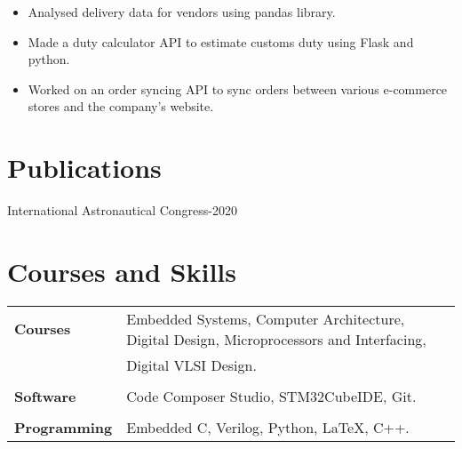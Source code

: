\documentclass{resume}
\begin{document}

\begin{itemize}\setlength{\itemsep}{0pt}\setlength{\parskip}{0pt}\vspace{-0.5em}
    \item Analysed delivery data for vendors using pandas library.
    \item Made a duty calculator API to estimate customs duty using Flask and python.
    \item Worked on an order syncing API to sync orders between various e-commerce stores and the company's website.
\end{itemize}

\vspace{-0.5cm}
\section{Publications}
 { International Astronautical Congress-2020}
\section{Courses and Skills}
\vspace{-0.5cm}
\begin{table}[!htb]
    \begin{tabular}{l|l}
    \textbf{Courses}        &   Embedded Systems, Computer Architecture, Digital Design, Microprocessors and Interfacing,   \\
                            &   Digital VLSI Design.\\
                            &   \\
    \textbf{Software}       &   Code Composer Studio, STM32CubeIDE, Git.\\
                            &   \\
    \textbf{Programming}    &   Embedded C, Verilog, Python, \LaTeX, C++.\\
    \end{tabular}
\end{table}
\vspace{-0.5cm}
\end{document}
